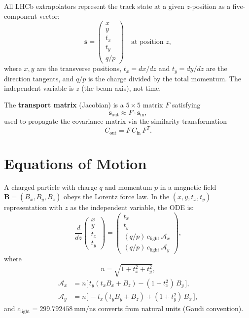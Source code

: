 \documentclass[11pt,a4paper]{article}
\newcommand{\qop}{q/p}
\newcommand{\bvec}[1]{\mathbf{#1}}
\newcommand{\vstate}{\bvec{s}}
\newcommand{\clgt}{c_\text{light}}
\begin{document}
All LHCb extrapolators represent the track state at a given $z$-position as a
five-component vector:
\begin{equation}\label{eq:statevec}
  \vstate = \begin{pmatrix} x \\ y \\ t_x \\ t_y \\ \qop \end{pmatrix}
  \quad\text{at position } z,
\end{equation}
where $x,y$ are the transverse positions, $t_x = dx/dz$ and $t_y = dy/dz$ are
the direction tangents, and $\qop$ is the charge divided by the total momentum.
The independent variable is $z$ (the beam axis), not time.

The \textbf{transport matrix} (Jacobian) is a $5\times5$ matrix $F$ satisfying
\begin{equation}
  \vstate_\text{out} \approx F \cdot \vstate_\text{in},
\end{equation}
used to propagate the covariance matrix via the similarity transformation
\begin{equation}
  C_\text{out} = F \, C_\text{in} \, F^T.
\end{equation}


\section{Equations of Motion}\label{sec:eom}

A charged particle with charge $q$ and momentum $p$ in a magnetic field
$\bvec{B} = (B_x, B_y, B_z)$ obeys the Lorentz force law. In the
$(x,y,t_x,t_y)$ representation with $z$ as the independent variable, the
ODE is:
\begin{equation}\label{eq:eom}
  \frac{d}{dz}
  \begin{pmatrix} x \\ y \\ t_x \\ t_y \end{pmatrix}
  =
  \begin{pmatrix} t_x \\ t_y \\ (\qop)\,\clgt\, \mathcal{A}_x \\ (\qop)\,\clgt\, \mathcal{A}_y \end{pmatrix},
\end{equation}
where
\begin{equation}
  n = \sqrt{1 + t_x^2 + t_y^2},
\end{equation}
\begin{align}
  \mathcal{A}_x &= n\bigl[\,t_y(t_x B_x + B_z) - (1+t_x^2)\,B_y\,\bigr], \label{eq:Ax} \\[4pt]
  \mathcal{A}_y &= n\bigl[\,-t_x(t_y B_y + B_z) + (1+t_y^2)\,B_x\,\bigr], \label{eq:Ay}
\end{align}
and $\clgt = 299.792458~\text{mm/ns}$ converts from natural units (Gaudi convention).
\end{document}
